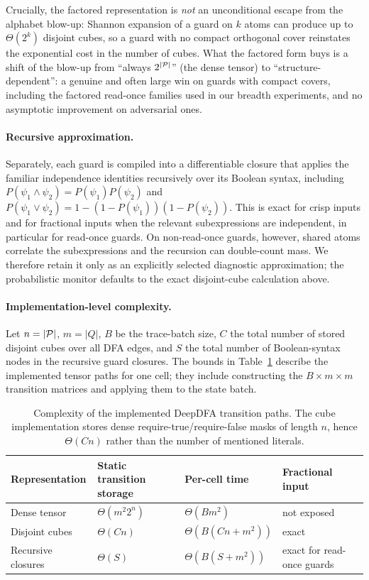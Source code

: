 Crucially, the factored representation is \emph{not} an unconditional escape from the alphabet blow-up: Shannon expansion of a guard on $k$ atoms can produce up to $\Theta(2^k)$ disjoint cubes, so a guard with no compact orthogonal cover reinstates the exponential cost in the number of cubes. What the factored form buys is a shift of the blow-up from ``always $2^{|{\mathcal{P}}|}$'' (the dense tensor) to ``structure-dependent'': a genuine and often large win on guards with compact covers, including the factored read-once families used in our breadth experiments, and no asymptotic improvement on adversarial ones.

\paragraph{Recursive approximation.} Separately, each guard is compiled into a differentiable closure that applies the familiar independence identities recursively over its Boolean syntax, including $P(\psi_1\land\psi_2)=P(\psi_1)P(\psi_2)$ and $P(\psi_1\lor\psi_2)=1-(1-P(\psi_1))(1-P(\psi_2))$. This is exact for crisp inputs and for fractional inputs when the relevant subexpressions are independent, in particular for read-once guards. On non-read-once guards, however, shared atoms correlate the subexpressions and the recursion can double-count mass. We therefore retain it only as an explicitly selected diagnostic approximation; the probabilistic monitor defaults to the exact disjoint-cube calculation above.

\paragraph{Implementation-level complexity.}
Let $n=|{\mathcal{P}}|$, $m=|Q|$, $B$ be the trace-batch size, $C$ the total number of stored disjoint cubes over all DFA edges, and $S$ the total number of Boolean-syntax nodes in the recursive guard closures. The bounds in Table~\ref{tab:deepdfa-complexity} describe the implemented tensor paths for one cell; they include constructing the $B\times m\times m$ transition matrices and applying them to the state batch.

\begin{table}[t]
  \centering
  \small
  \begin{tabular}{@{}llll@{}}
    \toprule
    Representation & Static transition storage & Per-cell time & Fractional input \\
    \midrule
    Dense tensor
      & $\Theta(m^2 2^n)$
      & $\Theta(Bm^2)$
      & not exposed \\
    Disjoint cubes
      & $\Theta(Cn)$
      & $\Theta\!\left(B(Cn+m^2)\right)$
      & exact \\
    Recursive closures
      & $\Theta(S)$
      & $\Theta\!\left(B(S+m^2)\right)$
      & exact for read-once guards \\
    \bottomrule
  \end{tabular}
  \caption{Complexity of the implemented DeepDFA transition paths. The cube implementation stores dense require-true/require-false masks of length $n$, hence $\Theta(Cn)$ rather than the number of mentioned literals.}
  \label{tab:deepdfa-complexity}
\end{table}

